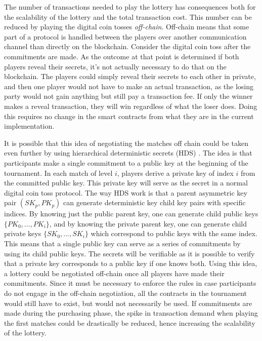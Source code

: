 The number of transactions needed to play the lottery has consequences both for the scalability of the lottery and the total transaction cost. This number can be reduced by playing the digital coin tosses \emph{off-chain}. Off-chain means that some part of a protocol is handled between the players over another communication channel than directly on the blockchain. Consider the digital coin toss after the commitments are made. As the outcome at that point is determined if both players reveal their secrets, it's not actually necessary to do that on the blockchain. The players could simply reveal their secrets to each other in private, and then one player would not have to make an actual transaction, as the losing party would not gain anything but still pay a transaction fee. If only the winner makes a reveal transaction, they will win regardless of what the loser does. Doing this requires no change in the smart contracts from what they are in the current implementation. 

It is possible that this idea of negotiating the matches off chain could be taken even further by using hierarchical deterministic secrets (HDS) \cite{wuille_bitcoin_2012}. The idea is that participants make a single commitment to a public key at the beginning of the tournament. In each match of level $i$, players derive a private key of index $i$ from the committed public key. This private key will serve as the secret in a normal digital coin toss protocol. The way HDS work is that a parent asymmetric key pair $(SK_p, PK_p)$ can generate deterministic key child key pairs with specific indices. By knowing just the public parent key, one can generate child public keys $\{PK_0, ..., PK_i\}$, and by knowing the private parent key, one can generate child private keys $\{SK_0, ..., SK_i\}$ which correspond to public keys with the same index. This means that a single public key can serve as a series of commitments by using its child public keys. The secrets will be verifiable as it is possible to verify that a private key corresponds to a public key if one knows both. Using this idea, a lottery could be negotiated off-chain once all players have made their commitments. Since it must be necessary to enforce the rules in case participants do not engage in the off-chain negotiation, all the contracts in the tournament would still have to exist, but would not necessarily be used. If commitments are made during the purchasing phase, the spike in transaction demand when playing the first matches could be drastically be reduced, hence increasing the scalability of the lottery.

